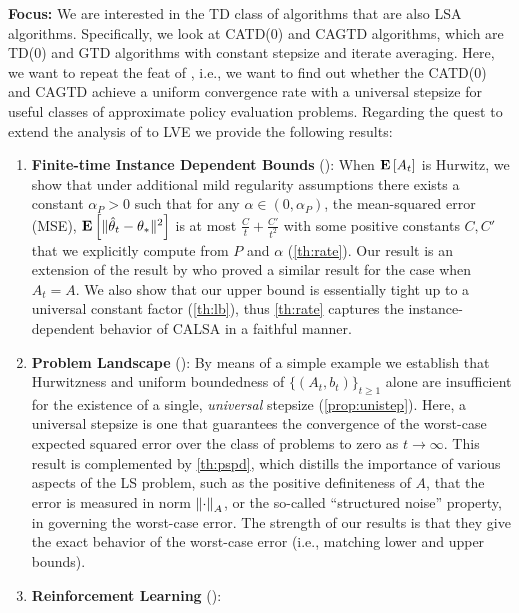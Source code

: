 \textbf{Focus:} We are interested in the TD class of algorithms that are also LSA algorithms. Specifically, we look at CATD(0) and CAGTD algorithms, which are TD(0) and GTD algorithms with constant stepsize and iterate averaging. Here, we want to repeat the feat of \cite{bach}, i.e., we want to find out whether the CATD(0) and CAGTD achieve a uniform convergence rate with a universal stepsize for useful classes of approximate policy evaluation problems. 
\fi
Regarding the quest to extend the analysis of  \citet{bach-moulines} to LVE we provide the following results:
\begin{enumerate}[topsep=0pt,itemsep=1pt,wide, labelwidth=!, labelindent=0pt,label=\emph{\arabic*}.]
\item \textbf{Finite-time Instance Dependent Bounds} (): 
When $\mathbf{E}\left[A_t\right]$ is Hurwitz, we show that under additional mild regularity assumptions 
there exists a constant $\alpha_P>0$ such that for any $\alpha\in (0,\alpha_P)$,
the mean-squared error (MSE), $\mathbf{E}\left[\| \hat{\theta}_t-\theta_*\|^2\right]$
is at most $\frac{C}{t}+\frac{C'}{t^2}$ 
with some positive constants $C,C'$ that we explicitly compute from $P$ and $\alpha$
(\cref{th:rate}).
Our result is an extension of the result by \citet{polyak-judisky} who proved a similar result
for the case when $A_t=A$. 
We also show that our upper bound is essentially tight up to a universal constant
factor (\cref{th:lb}), thus \cref{th:rate}  captures the instance-dependent
behavior of CALSA in a faithful manner.
\item \textbf{Problem Landscape} (): 
By means of a simple example we establish that 
Hurwitzness and uniform boundedness of $\{(A_t,b_t)\}_{t\ge 1}$
alone are insufficient for the existence of a single, \emph{universal} stepsize (\cref{prop:unistep}).
Here, a universal stepsize is one that guarantees the convergence of the worst-case expected squared 
error over the class of problems to zero as $t\to\infty$.
This result is complemented by \cref{th:pspd}, which distills the importance of various aspects
of the LS problem, such as the positive definiteness of $A$, that the error is measured in norm $\left\| \cdot\right\|_A$, or the so-called ``structured noise'' property, in governing the worst-case
error. The strength of our results is that they give the exact behavior of the worst-case error (i.e.,
matching lower and upper bounds).
\item \textbf{Reinforcement Learning} (): 

\end{enumerate}
